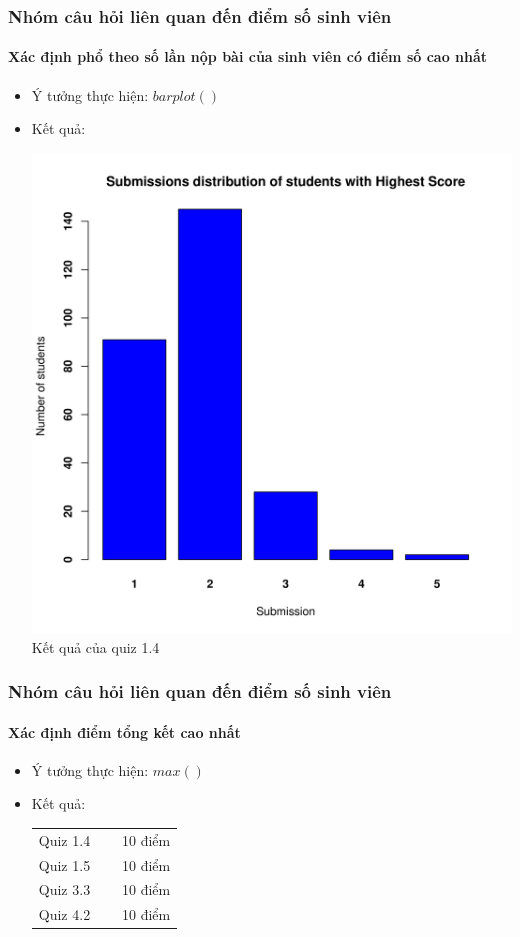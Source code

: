 \documentclass[english,10pt,table]{beamer}
\begin{document}
\frame
{
\frametitle{Nhóm câu hỏi liên quan đến điểm số sinh viên}
\framesubtitle{Xác định phổ theo số lần nộp bài của sinh viên có điểm số cao nhất}
\begin{itemize}
    \item Ý tưởng thực hiện: $barplot()$
    \item Kết quả:\\
    \begin{center}
        \includegraphics[width = 6 cm]{Images/img2-3-1.png}\\
        Kết quả của quiz 1.4
    \end{center}
\end{itemize}
}

\frame
{
\frametitle{Nhóm câu hỏi liên quan đến điểm số sinh viên}
\framesubtitle{Xác định điểm tổng kết cao nhất}
\begin{itemize}
    \item Ý tưởng thực hiện: $max()$
    \item Kết quả:\\
    \begin{center}
        \begin{tabular}{l l r}
             Quiz 1.4 & $\;$ & 10 điểm\\
             Quiz 1.5 & $\;$ & 10 điểm\\
             Quiz 3.3 & $\;$ & 10 điểm\\
             Quiz 4.2 & $\;$ & 10 điểm
        \end{tabular}
    \end{center}
\end{itemize}
}
\end{document}
